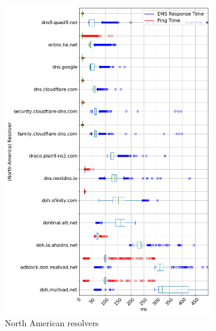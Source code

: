 \begin{figure}[t!]
    \centering
    \begin{subfigure}[t]{0.5\textwidth}
        \centering
        \includegraphics[width=\linewidth]{figures/Ohio_North_America.png}
        \caption{North American resolvers}
    \end{subfigure}%
    ~ 
    \begin{subfigure}[t]{0.5\textwidth}
        \centering

\end{subfigure}
\end{figure}
